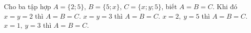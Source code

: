 \begin{ex}
Cho ba tập hợp $A=\{2;5\}$, $B=\{5;x\}$, $C=\{x;y;5\}$, biết $A=B=C$. Khi đó
\choiceTF
{\True $x=y=2$ thì $A=B=C$.}
{$x=y=3$ thì $A=B=C$.}
{\True $x=2,\ y=5$ thì $A=B=C$.}
{$x=1,\ y=3$ thì $A=B=C$.}
\end{ex}
